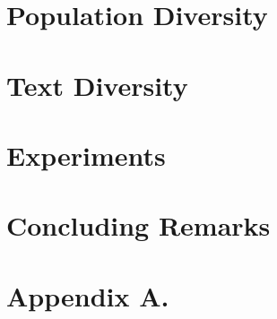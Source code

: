 \documentclass{article} %
\begin{document}
\section{Population Diversity}
\label{sec:popular-diversity}



\section{Text Diversity}
\label{sec:text-diversity}



\section{Experiments}
\label{sec:experiments}




\section{Concluding Remarks}
\label{sec:conclusions}




\newpage

\appendix
\section*{Appendix A.}




\end{document}
